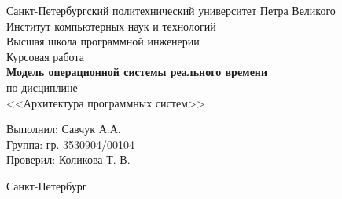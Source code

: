 \begin{titlepage}	%

	\begin{center}		%

		\large Санкт-Петербургский политехнический университет Петра Великого\\
		\large Институт компьютерных наук и технологий\\
		\large Высшая школа программной инженерии \\[6cm]

    \huge Курсовая работа \\%
		\large \textbf{Модель операционной системы реального времени} \\ [0.5cm]
		\large по дисциплине\\[0.1cm]
		\large <<Архитектура программных систем>>\\[5cm]

	\end{center}

		\noindent\large Выполнил: \hfill \large Савчук А.А.\\
		\noindent\large Группа: \hfill \large гр. 3530904/00104\\

		\noindent\large Проверил: \hfill \large Коликова Т. В.

	\vfill %

	\begin{center}
	\large Санкт-Петербург\\
	\large \the\year %
	\end{center} %

\end{titlepage} %

\vfill %
